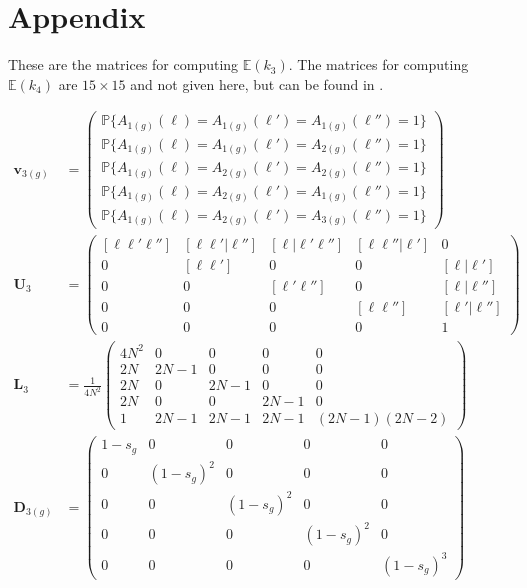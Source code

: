 \documentclass[11pt]{amsart}
\begin{document}
\section*{Appendix}
These are the matrices for computing $\mathbb{E}(k_3)$. The matrices for computing $\mathbb{E}(k_4)$ are $15\times  15$ and not given here, but can be found in \citep{hill1974disequilibrium}.

\begin{align*}
	\mathbf{v}_{3(g)}&=\left( \begin{array}{c}
					 \mathbb{P}\{A_{1(g)}(\ell)=A_{1(g)}(\ell')=A_{1(g)}(\ell'')=1\}\\
					 \mathbb{P}\{A_{1(g)}(\ell)=A_{1(g)}(\ell')=A_{2(g)}(\ell'')=1\} 	\\
					 \mathbb{P}\{A_{1(g)}(\ell)=A_{2(g)}(\ell')=A_{2(g)}(\ell'')=1\} 	\\
					 \mathbb{P}\{A_{1(g)}(\ell)=A_{2(g)}(\ell')=A_{1(g)}(\ell'')=1\} 	\\
					 \mathbb{P}\{A_{1(g)}(\ell)=A_{2(g)}(\ell')=A_{3(g)}(\ell'')=1\}
				\end{array} \right)\\
	\mathbf{U}_3&=\left( \begin{array}{ccccc}
					 [\ell\ell'\ell''] 		& [\ell\ell'|\ell''] 	& [\ell|\ell'\ell''] & [\ell\ell''|\ell'] & 0\\
					 0 	& [\ell\ell'] & 0 & 0 & [\ell|\ell']\\
					 0 	& 0 & [\ell'\ell''] & 0 & [\ell|\ell'']\\
					 0 	& 0 & 0 & [\ell\ell''] & [\ell'|\ell'']\\
					 0&0&0&0&1
				\end{array} \right)\\
	\mathbf{L}_3&=\frac{1}{4N^2}\left( \begin{array}{ccccc}
					 4N^2 		& 0 	& 0 & 0 & 0\\
					 2N 	& 2N-1 & 0 & 0 & 0\\
					 2N 	& 0 & 2N-1 & 0 & 0\\
					 2N 	& 0 & 0 & 2N-1 & 0\\
					 1 & 2N-1 & 2N-1 & 2N-1 & (2N-1)(2N-2)
				\end{array} \right)\\
		\mathbf{D}_{3(g)}&=\left( \begin{array}{ccccc}
					 1-s_g		& 0 	& 0 & 0 & 0\\
					 0 	& (1-s_g)^2 & 0 & 0 & 0\\
					 0 	& 0 & (1-s_{g})^2 & 0 & 0\\
					 0 	& 0 & 0 & (1-s_{g})^2 & 0\\
					 0 & 0 & 0 & 0 & (1-s_{g})^3
				\end{array} \right)
\end{align*}
\end{document}
